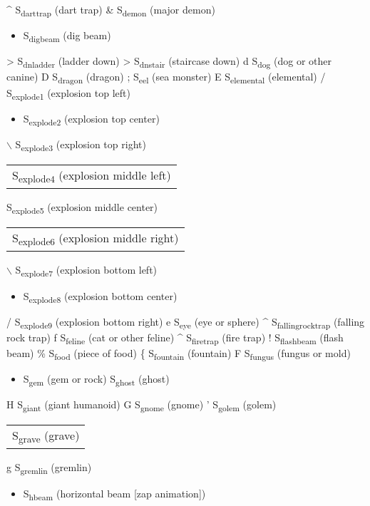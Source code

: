\documentclass[11pt]{article}
\begin{document}
\^{} S\textsubscript{dart}\textsubscript{trap}      (dart trap)
\& S\textsubscript{demon}        (major demon)
\begin{itemize}
\item S\textsubscript{digbeam}       (dig beam)
\end{itemize}
> S\textsubscript{dnladder}       (ladder down)
> S\textsubscript{dnstair}       (staircase down)
d S\textsubscript{dog}         (dog or other canine)
D S\textsubscript{dragon}        (dragon)
; S\textsubscript{eel}         (sea monster)
E S\textsubscript{elemental}      (elemental)
/ S\textsubscript{explode1}       (explosion top left)
\begin{itemize}
\item S\textsubscript{explode2}       (explosion top center)
\end{itemize}
$\backslash$ S\textsubscript{explode3}       (explosion top right)
\begin{center}
\begin{tabular}{l}
S\textsubscript{explode4}       (explosion middle left)\\
\end{tabular}
\end{center}
S\textsubscript{explode5}       (explosion middle center)
\begin{center}
\begin{tabular}{l}
S\textsubscript{explode6}       (explosion middle right)\\
\end{tabular}
\end{center}
$\backslash$ S\textsubscript{explode7}       (explosion bottom left)
\begin{itemize}
\item S\textsubscript{explode8}       (explosion bottom center)
\end{itemize}
/ S\textsubscript{explode9}       (explosion bottom right)
e S\textsubscript{eye}         (eye or sphere)
\^{} S\textsubscript{falling}\textsubscript{rock}\textsubscript{trap}  (falling rock trap)
f S\textsubscript{feline}        (cat or other feline)
\^{} S\textsubscript{fire}\textsubscript{trap}      (fire trap)
! S\textsubscript{flashbeam}      (flash beam)
\% S\textsubscript{food}         (piece of food)
\{ S\textsubscript{fountain}       (fountain)
F S\textsubscript{fungus}        (fungus or mold)
\begin{itemize}
\item S\textsubscript{gem}         (gem or rock)
S\textsubscript{ghost}        (ghost)
\end{itemize}
H S\textsubscript{giant}        (giant humanoid)
G S\textsubscript{gnome}        (gnome)
' S\textsubscript{golem}        (golem)
\begin{center}
\begin{tabular}{l}
S\textsubscript{grave}        (grave)\\
\end{tabular}
\end{center}
g S\textsubscript{gremlin}       (gremlin)
\begin{itemize}
\item S\textsubscript{hbeam}        (horizontal beam [zap animation])
\end{itemize}
\end{document}
